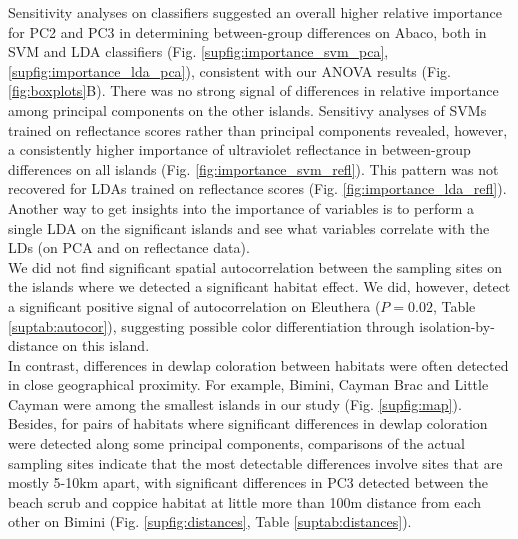 Sensitivity analyses on classifiers suggested an overall higher relative importance for PC2 and PC3 in determining between-group differences on Abaco, both in SVM and LDA classifiers (Fig. \ref{supfig:importance_svm_pca}, \ref{supfig:importance_lda_pca}), consistent with our ANOVA results (Fig. \ref{fig:boxplots}B). There was no strong signal of differences in relative importance among principal components on the other islands. Sensitivy analyses of SVMs trained on reflectance scores rather than principal components revealed, however, a consistently higher importance of ultraviolet reflectance in between-group differences on all islands (Fig. \ref{fig:importance_svm_refl}). This pattern was not recovered for LDAs trained on reflectance scores (Fig. \ref{fig:importance_lda_refl}). Another way to get insights into the importance of variables is to perform a single LDA on the significant islands and see what variables correlate with the LDs (on PCA and on reflectance data).\\


We did not find significant spatial autocorrelation between the sampling sites on the islands where we detected a significant habitat effect. We did, however, detect a significant positive signal of autocorrelation on Eleuthera ($P = 0.02$, Table \ref{suptab:autocor}), suggesting possible color differentiation through isolation-by-distance on this island.\\

In contrast, differences in dewlap coloration between habitats were often detected in close geographical proximity. For example, Bimini, Cayman Brac and Little Cayman were among the smallest islands in our study (Fig. \ref{supfig:map}). Besides, for pairs of habitats where significant differences in dewlap coloration were detected along some principal components, comparisons of the actual sampling sites indicate that the most detectable differences involve sites that are mostly 5-10km apart, with significant differences in PC3 detected between the beach scrub and coppice habitat at little more than 100m distance from each other on Bimini (Fig. \ref{supfig:distances}, Table \ref{suptab:distances}).\\


